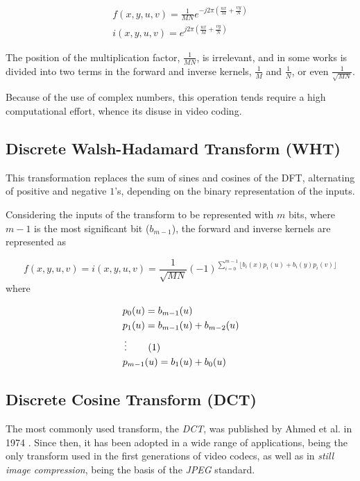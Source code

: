 \begin{gather}
    f(x,y,u,v) = \frac{1}{MN} e^{-j2\pi \left(\frac{ux}{M}+\frac{vy}{N}\right)} \\
    i(x,y,u,v) = e^{j2\pi \left(\frac{ux}{M}+\frac{vy}{N}\right)}
\end{gather}

The position of the multiplication factor, $\frac{1}{MN}$, is irrelevant, and in some works is divided into two terms in the forward and inverse kernels, $\frac{1}{M}$ and $\frac{1}{N}$, or even $\frac{1}{\sqrt{MN}}$. \nocite{gonzalezDigitalImageProcessing2018}

Because of the use of complex numbers, this operation tends require a high computational effort, whence its disuse in video coding.

\subsection{Discrete Walsh-Hadamard Transform (WHT)}

This transformation replaces the sum of sines and cosines of the DFT, alternating of positive and negative $1$'s, depending on the binary representation of the inputs.

Considering the inputs of the transform to be represented with $m$ bits, where $m-1$ is the most significant bit ($b_{m-1}$), the forward and inverse kernels are represented as

\begin{equation}
    f(x,y,u,v) = i(x,y,u,v) = \frac{1}{\sqrt{MN}}(-1)^{\sum_{i=0}^{m-1}\lfloor b_i(x)p_i(u)+b_i(y)p_i(v)\rfloor}
\end{equation}
where

\begin{align*}
    &p_0(u)=b_{m-1}(u) \\
    &p_1(u)=b_{m-1}(u) +b_{m-2}(u) \\
    \,&\vdots \addtocounter{equation}{1}\tag{\theequation} \\
    &p_{m-1}(u)=b_1(u)+b_0(u) 
\end{align*}

\subsection{Discrete Cosine Transform (DCT)}

The most commonly used transform, the \emph{DCT}, was published by Ahmed et al. in 1974 \cite{ahmedDiscreteCosineTransform1974}. Since then, it has been adopted in a wide range of applications, being the only transform used in the first generations of video codecs, as well as in \emph{still image compression}, being the basis of the \emph{\gls{JPEG}} standard.

